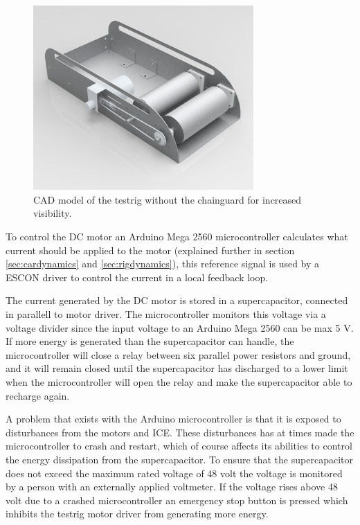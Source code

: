 \begin{figure}[H]
    \centering
    \includegraphics[width=0.75\textwidth]{./img/testrig_hardware.png}
    \caption{CAD model of the testrig without the chainguard for increased visibility.}
    \label{fig:testrig_hardware}
\end{figure}

To control the DC motor an Arduino Mega 2560 microcontroller
calculates what current should be applied to the motor (explained further in section \ref{sec:cardynamics} and \ref{sec:rigdynamics}), this reference signal
is used by a ESCON driver to control the current in a local feedback loop.

The current generated by the DC motor is stored in a supercapacitor, connected in parallell to motor driver. The microcontroller monitors this voltage via a voltage divider since the input voltage to an Arduino Mega 2560 can be max 5 V. If more energy is generated than the supercapacitor can handle, the microcontroller will close a relay between six parallel power resistors and ground, and it will remain closed until the supercapacitor has discharged to a lower limit when the microcontroller will open the relay and make the supercapacitor able to recharge again.

A problem that exists with the Arduino microcontroller is that it is exposed to disturbances from the motors and ICE. These disturbances has at times made the microcontroller to crash and restart, which of course affects its abilities to control the energy dissipation from the supercapacitor. To ensure that the supercapacitor does not exceed the maximum rated voltage of 48 volt the voltage is monitored by a person with an externally applied voltmeter. If the voltage rises above 48 volt due to a crashed microcontroller an emergency stop button is pressed which inhibits the testrig motor driver from generating more energy. 


